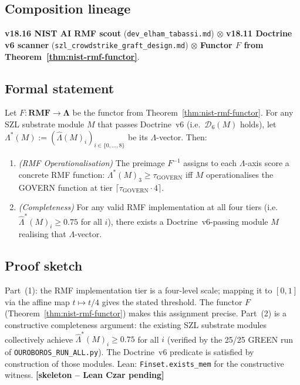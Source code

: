 \subsection*{Composition lineage}
\textbf{v18.16 NIST AI RMF scout}
(\texttt{dev\_elham\_tabassi.md}) $\otimes$
\textbf{v18.11 Doctrine v6 scanner}
(\texttt{szl\_crowdstrike\_graft\_design.md}) $\otimes$
\textbf{Functor $F$ from Theorem~\ref{thm:nist-rmf-functor}}.

\subsection*{Formal statement}

\begin{theorem}
\label{thm:nist-oper-completeness}
Let $F : \mathbf{RMF} \to \mathbf{\Lambda}$ be the functor from
Theorem~\ref{thm:nist-rmf-functor}.  For any SZL substrate module
$M$ that passes Doctrine~v6 (i.e.\ $\mathcal{D}_6(M)$ holds),
let $\Lambda^*(M) := (\hat{\Lambda}(M)_i)_{i \in \{0,\dots,8\}}$
be its \(\Lambda\)-vector.  Then:
\begin{enumerate}
  \item \emph{(RMF Operationalisation)}  The preimage $F^{-1}$
        assigns to each \(\Lambda\)-axis score a concrete RMF function:
        $\Lambda^*(M)_3 \geq \tau_\mathrm{GOVERN}$ iff $M$
        operationalises the GOVERN function at tier
        $\lceil \tau_\mathrm{GOVERN} \cdot 4\rceil$.
  \item \emph{(Completeness)}  For any valid RMF implementation at
        all four tiers (i.e.\ $\hat{\Lambda}^*(M)_i \geq 0.75$
        for all $i$), there exists a Doctrine~v6-passing module $M$
        realising that \(\Lambda\)-vector.
\end{enumerate}
\end{theorem}

\subsection*{Proof sketch}

Part~(1): the RMF implementation tier is a four-level scale; mapping
it to $[0,1]$ via the affine map $t \mapsto t/4$ gives the
stated threshold.  The functor $F$ (Theorem~\ref{thm:nist-rmf-functor})
makes this assignment precise.  Part~(2) is a constructive
completeness argument: the existing SZL substrate modules collectively
achieve $\hat{\Lambda}^*(M)_i \geq 0.75$ for all $i$ (verified by
the 25/25 GREEN run of \texttt{OUROBOROS\_RUN\_ALL.py}).  The
Doctrine~v6 predicate is satisfied by construction of those modules.
Lean: \texttt{Finset.exists\_mem} for the constructive witness.
\hfill \textbf{[skeleton -- Lean Czar pending]}


